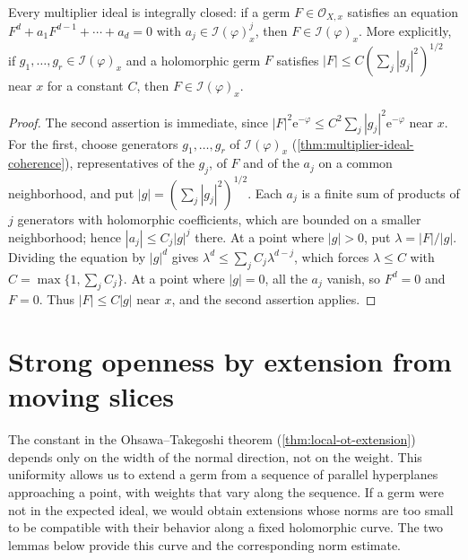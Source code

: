 \begin{proposition}\label{prop:multiplier-integral-closure}
Every multiplier ideal is integrally closed: if a germ $F\in\mathcal O_{X,x}$ satisfies an equation $F^d+a_1F^{d-1}+\cdots+a_d=0$ with $a_j\in\mathcal I(\varphi)_x^j$, then $F\in\mathcal I(\varphi)_x$. More explicitly, if $g_1,\ldots,g_r\in\mathcal I(\varphi)_x$ and a holomorphic germ $F$ satisfies $|F|\leq C(\sum_j|g_j|^2)^{1/2}$ near $x$ for a constant $C$, then $F\in\mathcal I(\varphi)_x$.
\end{proposition}
\begin{proof}
The second assertion is immediate, since $|F|^2\mathrm e^{-\varphi}\leq C^2\sum_j|g_j|^2\mathrm e^{-\varphi}$ near $x$. For the first, choose generators $g_1,\ldots,g_r$ of $\mathcal I(\varphi)_x$ (\cref{thm:multiplier-ideal-coherence}), representatives of the $g_j$, of $F$ and of the $a_j$ on a common neighborhood, and put $|g|=(\sum_j|g_j|^2)^{1/2}$. Each $a_j$ is a finite sum of products of $j$ generators with holomorphic coefficients, which are bounded on a smaller neighborhood; hence $|a_j|\leq C_j|g|^j$ there. At a point where $|g|>0$, put $\lambda=|F|/|g|$. Dividing the equation by $|g|^d$ gives $\lambda^d\leq\sum_jC_j\lambda^{d-j}$, which forces $\lambda\leq C$ with $C=\max\{1,\sum_jC_j\}$. At a point where $|g|=0$, all the $a_j$ vanish, so $F^d=0$ and $F=0$. Thus $|F|\leq C|g|$ near $x$, and the second assertion applies.
\end{proof}

\section{Strong openness by extension from moving slices}
\label{sec:strong-openness}

The constant in the Ohsawa--Takegoshi theorem (\cref{thm:local-ot-extension}) depends only on the width of the normal direction, not on the weight. This uniformity allows us to extend a germ from a sequence of parallel hyperplanes approaching a point, with weights that vary along the sequence. If a germ were not in the expected ideal, we would obtain extensions whose norms are too small to be compatible with their behavior along a fixed holomorphic curve. The two lemmas below provide this curve and the corresponding norm estimate.

